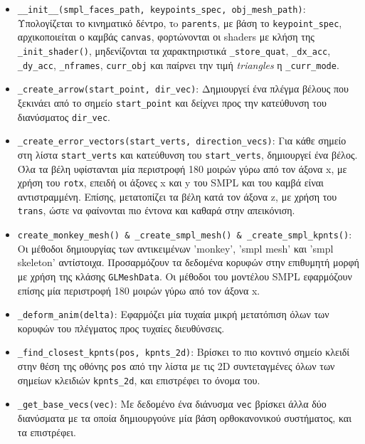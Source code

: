 \begin{itemize}
	\item \texttt{\_\_init\_\_(smpl\_faces\_path, keypoints\_spec, obj\_mesh\_path)}: Υπολογίζεται το κινηματικό δέντρο, τo \texttt{parents}, με βάση το \texttt{keypoint\_spec}, αρχικοποιείται ο καμβάς \texttt{canvas}, φορτώνονται οι shaders με κλήση της \texttt{\_init\_shader()}, μηδενίζονται τα χαρακτηριστικά \texttt{\_store\_quat}, \texttt{\_dx\_acc}, \texttt{\_dy\_acc}, \texttt{\_nframes}, \texttt{curr\_obj} και παίρνει την τιμή \textsl{triangles} η \texttt{\_curr\_mode}.
	
	\item \texttt{\_create\_arrow(start\_point, dir\_vec)}: Δημιουργεί ένα πλέγμα βέλους που ξεκινάει από το σημείο \texttt{start\_point} και δείχνει προς την κατεύθυνση του διανύσματος \texttt{dir\_vec}.
	\item \texttt{\_create\_error\_vectors(start\_verts, direction\_vecs)}: Για κάθε σημείο στη λίστα \texttt{start\_verts} και κατεύθυνση του \texttt{start\_verts}, δημιουργεί ένα βέλος. Όλα τα βέλη υφίστανται μία περιστροφή 180 μοιρών γύρω από τον άξονα x, με χρήση του \texttt{rotx}, επειδή οι άξονες x και y του SMPL και του καμβά είναι αντιστραμμένη. Επίσης, μετατοπίζει τα βέλη κατά τον άξονα z, με χρήση του \texttt{trans}, ώστε να φαίνονται πιο έντονα και καθαρά στην απεικόνιση.
	
	\item \texttt{create\_monkey\_mesh() \& \_create\_smpl\_mesh() \& \_create\_smpl\_kpnts()}: Οι μέθοδοι δημιουργίας των αντικειμένων 'monkey', 'smpl mesh' και 'smpl skeleton' αντίστοιχα. Προσαρμόζουν τα δεδομένα κορυφών στην επιθυμητή μορφή με χρήση της κλάσης \texttt{GLMeshData}. Οι μέθοδοι του μοντέλου SMPL εφαρμόζουν επίσης μία περιστροφή 180 μοιρών γύρω από τον άξονα x.
	
	\item \texttt{\_deform\_anim(delta)}: Εφαρμόζει μία τυχαία μικρή μετατόπιση όλων των κορυφών του πλέγματος προς τυχαίες διευθύνσεις.
	
	\item \texttt{\_find\_closest\_kpnts(pos, kpnts\_2d)}: Βρίσκει το πιο κοντινό σημείο κλειδί στην θέση της οθόνης \texttt{pos} από την λίστα με τις 2D συντεταγμένες όλων των σημείων κλειδιών \texttt{kpnts\_2d}, και επιστρέφει το όνομα του.
	
	\item \texttt{\_get\_base\_vecs(vec)}: Με δεδομένο ένα διάνυσμα \texttt{vec} βρίσκει άλλα δύο διανύσματα με τα οποία δημιουργούνε μία βάση ορθοκανονικού συστήματος, και τα επιστρέφει.
	

\end{itemize}
